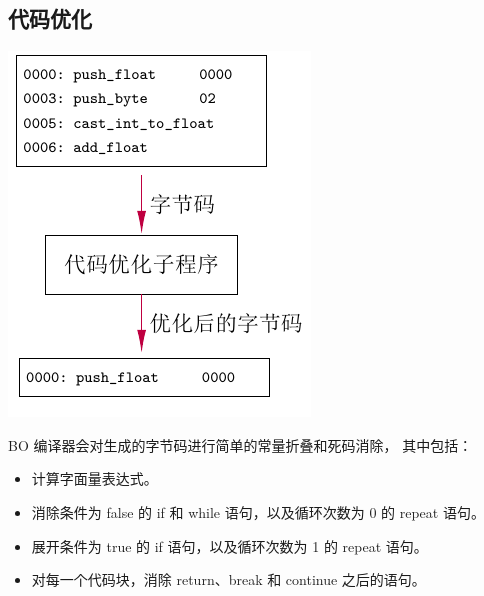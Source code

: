\documentclass[dvipsnames, svgnames, x11names]{beamer}
\begin{document}
\subsection{代码优化}
\begin{frame}
    \begin{minipage}{.4\linewidth}
    \includegraphics[width=\linewidth]{../figure/optimizer.pdf}
    \end{minipage}
    \quad
    \begin{minipage}{.55\linewidth}
    \onslide<+->BO 编译器会对生成的字节码进行简单的常量折叠和死码消除，
    \onslide<+->其中包括：
    \begin{itemize}[<+->]
        \item 计算字面量表达式。
        \item 消除条件为 false 的 if 和 while 语句，以及循环次数为 0 的 repeat 语句。
        \item 展开条件为 true 的 if 语句，以及循环次数为 1 的 repeat 语句。
        \item 对每一个代码块，消除 return、break 和 continue 之后的语句。
    \end{itemize}
    \end{minipage}
\end{frame}
\end{document}
